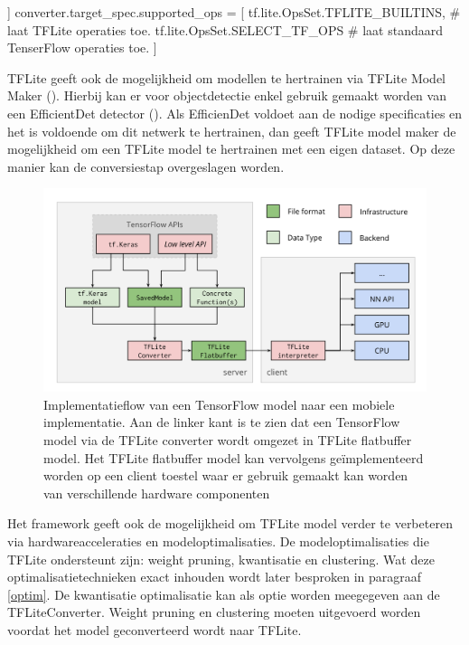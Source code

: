 \begin{python}]
converter.target_spec.supported_ops = [
	tf.lite.OpsSet.TFLITE_BUILTINS, # laat TFLite operaties toe.
	tf.lite.OpsSet.SELECT_TF_OPS # laat standaard TenserFlow operaties toe.
  ]
\end{python}	

TFLite geeft ook de mogelijkheid om modellen te hertrainen via TFLite Model Maker (\cite{tensorflow2015-whitepaper}).
Hierbij kan er voor objectdetectie enkel gebruik gemaakt worden van een EfficientDet detector (\cite{tan_efficientdet_2020}).
Als EfficienDet voldoet aan de nodige specificaties en het is voldoende om dit netwerk te hertrainen, dan geeft TFLite model maker de mogelijkheid om een TFLite model te hertrainen met een eigen dataset.
Op deze manier kan de conversiestap overgeslagen worden.

\begin{figure}[!ht]
    \centering
 	\includegraphics[width=0.7\linewidth]{fig/TFLite_workflow.png}
 	\caption{Implementatieflow van een TensorFlow model naar een mobiele implementatie. Aan de linker kant is te zien dat een TensorFlow model via de TFLite converter wordt omgezet in TFLite flatbuffer model.
	 Het TFLite flatbuffer model kan vervolgens ge\"implementeerd worden op een client toestel waar er gebruik gemaakt kan worden van verschillende hardware componenten}
 	\label{fig:tflite}
\end{figure}

Het framework geeft ook de mogelijkheid om TFLite model verder te verbeteren via hardwareacceleraties en modeloptimalisaties.
De modeloptimalisaties die TFLite ondersteunt zijn: weight pruning, kwantisatie en clustering.
Wat deze optimalisatietechnieken exact inhouden wordt later besproken in paragraaf \ref{optim}.
De kwantisatie optimalisatie kan als optie worden meegegeven aan de TFLiteConverter.
Weight pruning en clustering moeten uitgevoerd worden voordat het model geconverteerd wordt naar TFLite.


